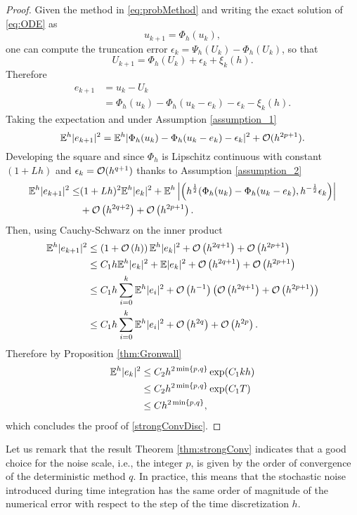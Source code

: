 \begin{proof}
Given the method in \eqref{eq:probMethod} and writing the exact solution of \eqref{eq:ODE} as
\begin{equation}
	u_{k+1} = \Phi_h(u_k),
\end{equation}
one can compute the truncation error $\epsilon_k = \Psi_h(U_k) - \Phi_h(U_k)$, so that
\begin{equation}
	U_{k+1} = \Phi_h(U_k) + \epsilon_k + \xi_k(h).
\end{equation}
Therefore
\begin{align}
	e_{k+1} &= u_k - U_k \\
			&= \Phi_h(u_k) - \Phi_h(u_k - e_k) - \epsilon_k - \xi_k(h).
\end{align}
Taking the expectation and under Assumption \ref{assumption_1}
\begin{equation}
	\mathbb{E}^h|e_{k+1}|^2 = \mathbb{E}^h|\Phi_h(u_k) - \Phi_h(u_k - e_k) - \epsilon_k|^2 + \mathcal{O}(h^{2p + 1}).
\end{equation}
Developing the square and since $\Phi_h$ is Lipschitz continuous with constant $(1 + Lh)$ and $\epsilon_k = \mathcal{O}(h^{q+1})$ thanks to Assumption \ref{assumption_2}
\begin{align}
	\mathbb{E}^h|e_{k+1}|^2 \leq &(1 + Lh)^2 \mathbb{E}^h|e_k|^2 + \mathbb{E}^h\left|\left(h^{\frac{1}{2}}(\Phi_h(u_k) - \Phi_h(u_k - e_k), h^{-\frac{1}{2}}\epsilon_k\right)\right| \\
						 &+ \mathcal{O}\left(h^{2q+2}\right) + \mathcal{O}\left(h^{2p + 1}\right). 
\end{align}
Then, using Cauchy-Schwarz on the inner product
\begin{align}
	\mathbb{E}^h|e_{k+1}|^2 &\leq \left(1 + \mathcal{O}\left(h\right)\right)\mathbb{E}^h|e_k|^2 + \mathcal{O}\left(h^{2q + 1}\right) + \mathcal{O}\left(h^{2p + 1}\right) \\
	&\leq C_1 h \mathbb{E}^h|e_k|^2 + \mathbb{E}|e_k|^2 + \mathcal{O}\left(h^{2q + 1}\right) + \mathcal{O}\left(h^{2p + 1}\right) \\
	&\leq C_1 h \sum_{i = 0}^{k}\mathbb{E}^h|e_i|^2 + \mathcal{O}\left(h^{-1}\right)\left(\mathcal{O}\left(h^{2q + 1}\right) + \mathcal{O}\left(h^{2p + 1}\right)\right)\\
	&\leq C_1 h \sum_{i = 0}^{k}\mathbb{E}^h|e_i|^2 + \mathcal{O}\left(h^{2q}\right) + \mathcal{O}\left(h^{2p}\right).
\end{align}
Therefore by Proposition \ref{thm:Gronwall}
\begin{align}
	\mathbb{E}^h|e_{k}|^2 &\leq C_2 h^{2\min\{p,q\}} \exp(C_1kh)\\ 
		      &\leq C_2 h^{2\min\{p,q\}} \exp(C_1T) \\	
		      &\leq Ch^{2\min\{p,q\}},
\end{align}  	
which concludes the proof of \eqref{strongConvDisc}.
\end{proof}
\begin{remark} Let us remark that the result Theorem \ref{thm:strongConv} indicates that a good choice for the noise scale, i.e., the integer $p$, is given by the order of convergence of the deterministic method $q$. In practice, this means that the stochastic noise introduced during time integration has the same order of magnitude of the numerical error with respect to the step of the time discretization $h$. 
\end{remark}